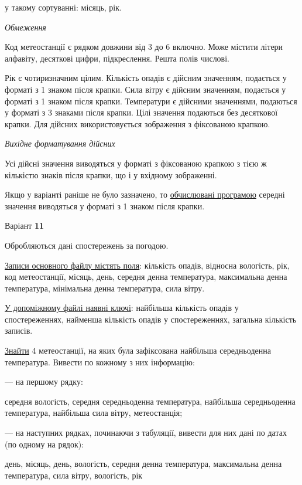 \documentclass[11pt, ukrainian]{article}
\begin{document}
{\noindent}у такому сортуванні: місяць, рік.


\bigskip\textit{Обмеження}

Код метеостанції є рядком довжини від 3 до 6 включно.
Може містити літери алфавіту, десяткові цифри, підкреслення. Решта полів числові.

Рік є чотиризначним цілим.
Кількість опадів є дійсним значенням, подається у форматі з 1 знаком після крапки.
Сила вітру є дійсним значенням, подається у форматі з 1 знаком після крапки.
Температури є дійсними значеннями, подаються у форматі з 3 знаками після крапки.
Цілі значення подаються без десяткової крапки.
Для дійсних використовується зображення з фіксованою крапкою.

\textit{Вихідне форматування дійсних}

Усі дійсні значення виводяться у форматі з фіксованою крапкою з тією ж кількістю знаків після крапки, що і у вхідному зображенні.

Якщо у варіанті раніше не було зазначено, то \underline{обчислювані програмою} середні значення виводяться у форматі з 1 знаком після крапки.


\par
\newpage
{\center Варіант  \No \textbf { 11 }\par}
\bigskip
Обробляються дані спостережень за погодою. 

\underline{Записи основного файлу містять поля}: кількість опадів, відносна вологість, рік, код метеостанції, місяць, день, середня денна температура, максимальна денна температура, мінімальна денна температура, сила вітру.

\underline{У допоміжному файлі наявні ключі}: найбільша кількість опадів у спостереженнях, найменша кількість опадів у спостереженнях, загальна кількість записів.

\underline{Знайти} 4 метеостанції, на яких була зафіксована найбільша середньоденна температура. Вивести по кожному з них інформацію:\par
{\noindent}--- на першому рядку:\par
середня вологість, середня середньоденна температура, найбільша середньоденна температура, найбільша сила вітру, метеостанція;

{\noindent}--- на наступних рядках, починаючи з табуляції, вивести для них дані по датах (по одному на рядок):\par
день, місяць, день, вологість, середня денна температура, максимальна денна температура, сила вітру, вологість, рік
\end{document}
